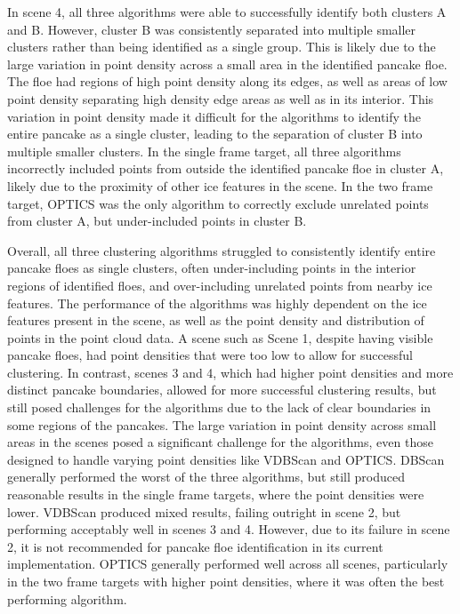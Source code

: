 In scene 4, all three algorithms were able to successfully identify both clusters A and B. However, cluster B was consistently separated into multiple smaller clusters rather than being identified as a single group. This is likely due to the large variation in point density across a small area in the identified pancake floe. The floe had regions of high point density along its edges, as well as areas of low point density separating high density edge areas as well as in its interior. This variation in point density made it difficult for the algorithms to identify the entire pancake as a single cluster, leading to the separation of cluster B into multiple smaller clusters. In the single frame target, all three algorithms incorrectly included points from outside the identified pancake floe in cluster A, likely due to the proximity of other ice features in the scene. In the two frame target, \ac{OPTICS} was the only algorithm to correctly exclude unrelated points from cluster A, but under-included points in cluster B.

Overall, all three clustering algorithms struggled to consistently identify entire pancake floes as single clusters, often under-including points in the interior regions of identified floes, and over-including unrelated points from nearby ice features. The performance of the algorithms was highly dependent on the ice features present in the scene, as well as the point density and distribution of points in the point cloud data. A scene such as Scene 1, despite having visible pancake floes, had point densities that were too low to allow for successful clustering. In contrast, scenes 3 and 4, which had higher point densities and more distinct pancake boundaries, allowed for more successful clustering results, but still posed challenges for the algorithms due to the lack of clear boundaries in some regions of the pancakes. The large variation in point density across small areas in the scenes posed a significant challenge for the algorithms, even those designed to handle varying point densities like \ac{VDBScan} and \ac{OPTICS}. \ac{DBScan} generally performed the worst of the three algorithms, but still produced reasonable results in the single frame targets, where the point densities were lower. \ac{VDBScan} produced mixed results, failing outright in scene 2, but performing acceptably well in scenes 3 and 4. However, due to its failure in scene 2, it is not recommended for pancake floe identification in its current implementation. \ac{OPTICS} generally performed well across all scenes, particularly in the two frame targets with higher point densities, where it was often the best performing algorithm.

